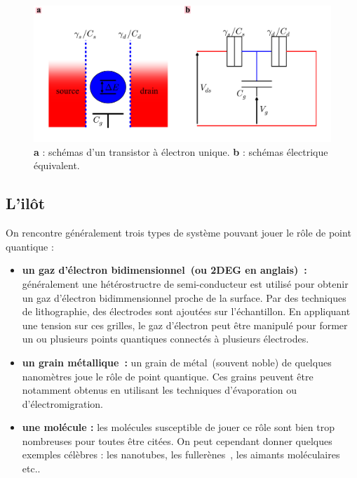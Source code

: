 \begin{figure}
\includegraphics[scale=0.5]{Theorie/Transport/figure1/figure1.pdf} 
\caption{\textbf{a} : schémas d'un transistor à électron unique. \textbf{b} : schémas électrique équivalent.}
\label{description_systeme}
\end{figure}



\subsection{L'il\^ot}
On rencontre généralement trois types de système pouvant jouer le rôle de point quantique :
\begin{itemize}
\item \textbf{un gaz d'électron bidimensionnel~(ou 2DEG en anglais)~\cite{Gordon1}:} généralement une hétérostructre de semi-conducteur est utilisé pour obtenir un gaz d'électron bidimmensionnel proche de la surface. Par des techniques de lithographie, des électrodes sont ajoutées sur l'échantillon. En appliquant une tension sur ces grilles, le gaz d'électron peut \^etre manipulé pour former un ou plusieurs points quantiques connectés à plusieurs électrodes.
\item \textbf{un grain métallique~\cite{Deshmukh2002}:} un grain de métal~(souvent noble) de quelques nanomètres joue le rôle de point quantique. Ces grains peuvent \^etre notamment obtenus en utilisant les techniques d'évaporation ou d'électromigration.
\item \textbf{une molécule \cite{Reed1,Park1}:} les molécules susceptible de jouer ce r\^ole sont bien trop nombreuses pour toutes \^etre citées. On peut cependant donner quelques exemples célèbres : les nanotubes, les fullerènes~\cite{Park1}, les aimants moléculaires~\cite{Heersche2006} etc.. \newline
\end{itemize}

